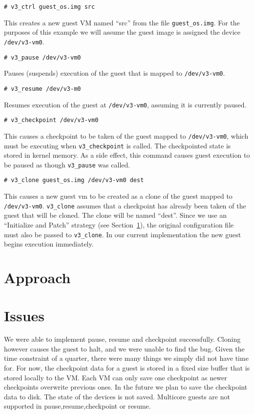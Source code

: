 \documentclass{acm_proc_article-sp}
\begin{document}
\begin{verbatim}
# v3_ctrl guest_os.img src
\end{verbatim}
This creates a new guest VM named ``src'' from the file \verb,guest_os.img,. For the purposes of this example we will assume the guest image is assigned the device \verb,/dev/v3-vm0,.

\begin{verbatim}
# v3_pause /dev/v3-vm0
\end{verbatim}
Pauses (suspends) execution of the guest that is mapped to \verb,/dev/v3-vm0,.

\begin{verbatim}
# v3_resume /dev/v3-m0
\end{verbatim}
Resumes execution of the guest at \verb,/dev/v3-vm0,, assuming it is currently paused.

\begin{verbatim}
# v3_checkpoint /dev/v3-vm0
\end{verbatim}
This causes a checkpoint to be taken of the guest mapped to \verb,/dev/v3-vm0,, which must be executing when \verb,v3_checkpoint, is called. The checkpointed state is stored in kernel memory. As a side effect, this command causes guest execution to be paused as though \verb,v3_pause, was called.

\begin{verbatim}
# v3_clone guest_os.img /dev/v3-vm0 dest
\end{verbatim}
This causes a new guest vm to be created as a clone of the guest mapped to \verb,/dev/v3-vm0,. \verb,v3_clone, assumes that a checkpoint has already been taken of the guest that will be cloned. The clone will be named ``dest''. Since we use an ``Initialize and Patch'' strategy (see Section~\ref{sec:approach}), the original configuration file must also be passed to \verb,v3_clone,.
In our current implementation the new guest begins execution immediately.

\section{Approach}
\label{sec:approach}

\section{Issues}
We were able to implement pause, resume and checkpoint successfully. Cloning however causes the guest to halt, and 
we were unable to find the bug. 
Given the time constraint of a quarter, there were many things we simply did not have time for.
For now, the checkpoint data for a guest is stored in a fixed size buffer that is stored locally to the VM. Each
VM can only save one checkpoint as newer checkpoints overwrite previous ones. In the future we plan to save
the checkpoint data to disk. The state of the devices is not saved. Multicore guests are not supported in pause,resume,checkpoint or resume.
\end{document}
